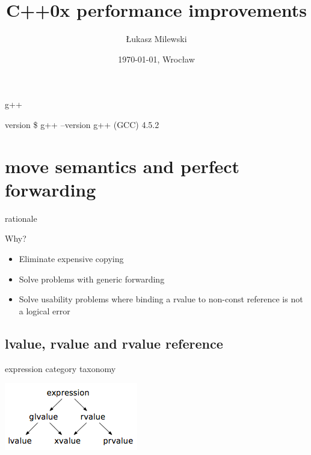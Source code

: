 \documentclass{beamer}
\title{C++0x performance improvements}
\author{Łukasz Milewski}
\institute{Uniwersytet Wrocławski}
\date{\today, Wrocław}
\begin{document}
\begin{frame}
  \titlepage
\end{frame}

\begin{frame}
  \tableofcontents
\end{frame}

\begin{frame}{g++}
  \begin{block}{version}
    \$ g++ --version
    g++ (GCC) 4.5.2
  \end{block}
\end{frame}

\section{move semantics and perfect forwarding}
\begin{frame}{rationale}
  \begin{block}{Why?}
    \begin{itemize}
    \item Eliminate expensive copying
    \item Solve problems with generic forwarding
    \item Solve usability problems where binding a rvalue to non-const reference is not a logical error
    \end{itemize}
  \end{block}
\end{frame}

\subsection{lvalue, rvalue and rvalue reference}
\begin{frame}{expression category taxonomy}
  \begin{center}
    \includegraphics[5cm]{valuetaxonomy.png}
  \end{center}
\end{frame}
\end{document}
